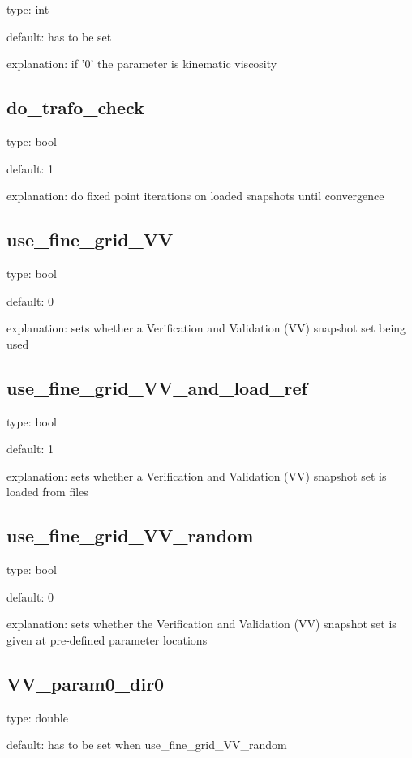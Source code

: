 \documentclass[a4paper,10pt]{article}
\begin{document}
\noindent type: int

\noindent default: has to be set

\noindent explanation: if '0' the parameter is kinematic viscosity

\subsection{do\_trafo\_check}

\noindent type: bool

\noindent default: 1

\noindent explanation: do fixed point iterations on loaded snapshots until convergence

   
\subsection{use\_fine\_grid\_VV}

\noindent type: bool

\noindent default: 0

\noindent explanation: sets whether a Verification and Validation (VV) snapshot set being used   

\subsection{use\_fine\_grid\_VV\_and\_load\_ref}

\noindent type: bool

\noindent default: 1

\noindent explanation: sets whether a Verification and Validation (VV) snapshot set is loaded from files 

\subsection{use\_fine\_grid\_VV\_random}

\noindent type: bool

\noindent default: 0

\noindent explanation: sets whether the Verification and Validation (VV) snapshot set is given at pre-defined parameter locations


\subsection{VV\_param0\_dir0}

\noindent type: double

\noindent default: has to be set when use\_fine\_grid\_VV\_random
\end{document}
